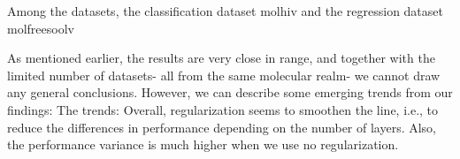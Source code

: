 
Among the datasets, the classification dataset molhiv and the regression dataset molfreesoolv

As mentioned earlier, the results are very close in range, and together with the limited number of datasets- all from the same molecular realm- we cannot draw any general conclusions. However, we can describe some emerging trends from our findings:
The trends:
Overall, regularization seems to smoothen the line, i.e., to reduce the differences in performance depending on the number of layers. Also, the performance variance is much higher when we use no regularization.
